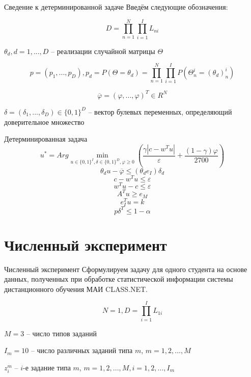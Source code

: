 \documentclass[aspectratio=169]{beamer}
\begin{document}
    \begin{frame}{Сведение к детерминированной задаче}
        Введём следующие обозначения:
        
        $$D=\prod_{n=1}^N\prod_{i=1}^I L_{ni}$$
        
        $\theta_d, d=1,...,D$ -- реализации случайной матрицы $\Theta$
        
        $$p=(p_1,...,p_D), p_d = P(\Theta=\theta_d)=\prod_{n=1}^N\prod_{i=1}^I P(\Theta_n^i=(\theta_d)_n^i)$$
        
        $$\overline{\varphi}=(\varphi,...,\varphi)^T\in R^N$$
        
        $\delta=(\delta_1,...,\delta_D)\in\{0,1\}^D$ -- вектор булевых переменных, определяющий доверительное множество
    \end{frame}
    
    \begin{frame}{Детерминированная задача}
        $$u^* = Arg\min_{u\in\{0, 1\}^I, \delta\in\{0, 1\}^D, \varphi\geq 0}\left(\frac{\gamma\left|c-w^T u\right|}{\varepsilon} + \frac{(1-\gamma)\varphi}{2700}\right)$$
        $$\theta_d u - \overline{\varphi}\leq(\theta_d e_I)\delta_d$$
        $$c-w^T u\leq\varepsilon$$
        $$w^T u-c\leq\varepsilon$$
        $$A^T u\geq e_M$$
        $$e_I^T u=k$$
        $$p\delta^T \leq 1-\alpha$$
    \end{frame}


    \section{Численный эксперимент}
    \begin{frame}{Численный эксперимент}
        Сформулируем задачу для одного студента на основе данных, полученных при обработке статистической информации системы дистанционного обучения МАИ CLASS.NET.
        
        $$N=1, D=\prod_{i=1}^I L_{1i}$$
        
        $M=3$ -- число типов заданий
        
        $I_m=10$ -- число различных заданий типа $m$, $m=1,2,...,M$
        
        $z_i^m$ -- $i$-е задание типа $m$, $m=1,2,...,M, i=1,2,...,I_m$
    \end{frame}
\end{document}
